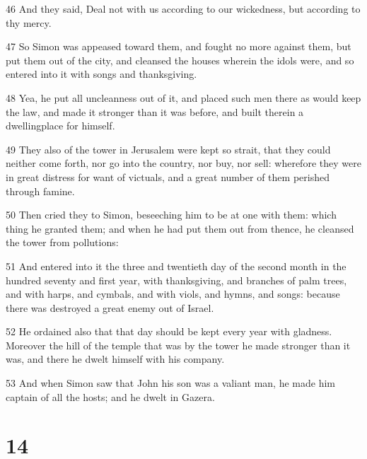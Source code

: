 \par 46 And they said, Deal not with us according to our wickedness, but according to thy mercy.
\par 47 So Simon was appeased toward them, and fought no more against them, but put them out of the city, and cleansed the houses wherein the idols were, and so entered into it with songs and thanksgiving.
\par 48 Yea, he put all uncleanness out of it, and placed such men there as would keep the law, and made it stronger than it was before, and built therein a dwellingplace for himself.
\par 49 They also of the tower in Jerusalem were kept so strait, that they could neither come forth, nor go into the country, nor buy, nor sell: wherefore they were in great distress for want of victuals, and a great number of them perished through famine.
\par 50 Then cried they to Simon, beseeching him to be at one with them: which thing he granted them; and when he had put them out from thence, he cleansed the tower from pollutions:
\par 51 And entered into it the three and twentieth day of the second month in the hundred seventy and first year, with thanksgiving, and branches of palm trees, and with harps, and cymbals, and with viols, and hymns, and songs: because there was destroyed a great enemy out of Israel.
\par 52 He ordained also that that day should be kept every year with gladness. Moreover the hill of the temple that was by the tower he made stronger than it was, and there he dwelt himself with his company.
\par 53 And when Simon saw that John his son was a valiant man, he made him captain of all the hosts; and he dwelt in Gazera.

\chapter{14}

